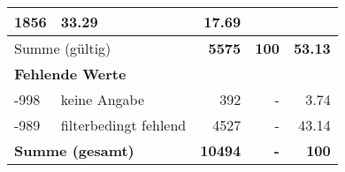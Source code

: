 \begin{longtable}{lXrrr}
       \num{1856} &
       \num[round-mode=places,round-precision=2]{33,29} &
         \num[round-mode=places,round-precision=2]{17,69} \\
     \midrule
     \multicolumn{2}{l}{Summe (gültig)} &
       \textbf{\num{5575}} &
     \textbf{100} &
       \textbf{\num[round-mode=places,round-precision=2]{53,13}} \\
     \multicolumn{5}{l}{\textbf{Fehlende Werte}}\\
       -998 &
       keine Angabe &
         \num{392} &
        - &
         \num[round-mode=places,round-precision=2]{3,74} \\
       -989 &
       filterbedingt fehlend &
         \num{4527} &
        - &
         \num[round-mode=places,round-precision=2]{43,14} \\
     \midrule
     \multicolumn{2}{l}{\textbf{Summe (gesamt)}} &
          \textbf{\num{10494}} &
        \textbf{-} &
        \textbf{100} \\
     \bottomrule
     \end{longtable}
     
